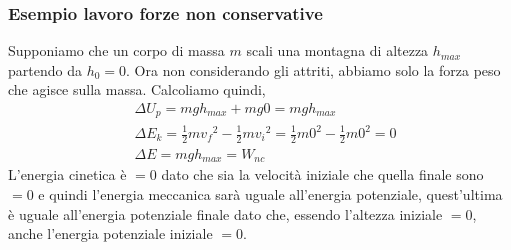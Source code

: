         \subsubsection{Esempio lavoro forze non conservative}
            Supponiamo che un corpo di massa $m$ scali una montagna di altezza $h_{max}$ partendo da $h_0=0$. Ora non considerando gli attriti, abbiamo solo la forza peso che agisce sulla massa. Calcoliamo quindi,
            \begin{align*}
                &\Delta U_p=mgh_{max}+mg0=mgh_{max}\\
                &\Delta E_k=\frac{1}{2}m{v_f}^2-\frac{1}{2}m{v_i}^2=\frac{1}{2}m0^2-\frac{1}{2}m{0}^2=0\\
                &\Delta E=mgh_{max}=W_{nc}
            \end{align*}
            L'energia cinetica è $=0$ dato che sia la velocità iniziale che quella finale sono $=0$ e quindi l'energia meccanica sarà uguale all'energia potenziale, quest'ultima è uguale all'energia potenziale finale dato che, essendo l'altezza iniziale $=0$, anche l'energia potenziale iniziale $=0$.

